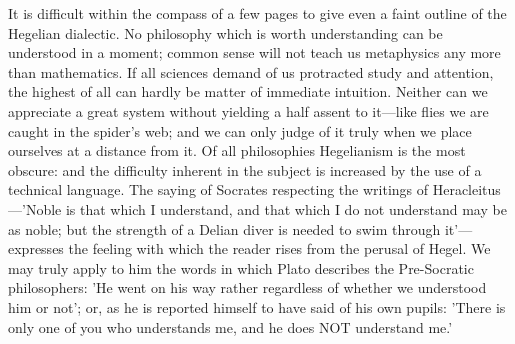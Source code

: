 \documentclass[11pt,letter]{article}
\begin{document}
\par  It is difficult within the compass of a few pages to give even a faint outline of the Hegelian dialectic. No philosophy which is worth understanding can be understood in a moment; common sense will not teach us metaphysics any more than mathematics. If all sciences demand of us protracted study and attention, the highest of all can hardly be matter of immediate intuition. Neither can we appreciate a great system without yielding a half assent to it—like flies we are caught in the spider's web; and we can only judge of it truly when we place ourselves at a distance from it. Of all philosophies Hegelianism is the most obscure: and the difficulty inherent in the subject is increased by the use of a technical language. The saying of Socrates respecting the writings of Heracleitus—'Noble is that which I understand, and that which I do not understand may be as noble; but the strength of a Delian diver is needed to swim through it'—expresses the feeling with which the reader rises from the perusal of Hegel. We may truly apply to him the words in which Plato describes the Pre-Socratic philosophers: 'He went on his way rather regardless of whether we understood him or not'; or, as he is reported himself to have said of his own pupils: 'There is only one of you who understands me, and he does NOT understand me.'
\end{document}
